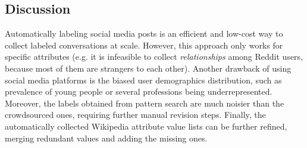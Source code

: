 





\subsection{Discussion}

Automatically labeling social media posts is an efficient and low-cost way to collect labeled conversations at scale. However, this approach only works for specific attributes (e.g. it is infeasible to collect \textit{relationships} among Reddit users, because most of them are strangers to each other). Another drawback of using social media platforms is the biased user demographics distribution, such as prevalence of young people or several professions being underrepresented. Moreover, the labels obtained from pattern search are much noisier than the crowdsourced ones, requiring further manual revision steps. Finally, the automatically collected Wikipedia attribute value lists can be further refined, merging redundant values and adding the missing ones.